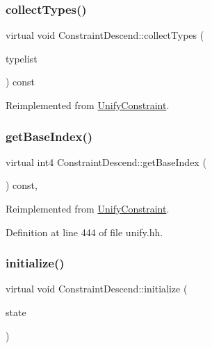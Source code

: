 \subsubsection{\texorpdfstring{collectTypes()}{collectTypes()}}
{\footnotesize\ttfamily virtual void Constraint\+Descend\+::collect\+Types (\begin{DoxyParamCaption}\item[{vector$<$ \mbox{\hyperlink{class_unify_datatype}{Unify\+Datatype}} $>$ \&}]{typelist }\end{DoxyParamCaption}) const\hspace{0.3cm}{\ttfamily [virtual]}}



Reimplemented from \mbox{\hyperlink{class_unify_constraint_acb83b6bea3b21e13054e72ac9cfaba0f}{Unify\+Constraint}}.

\mbox{\label{class_constraint_descend_ac1d8e7071688fed4a52ef6aace039344}} 
\subsubsection{\texorpdfstring{getBaseIndex()}{getBaseIndex()}}
{\footnotesize\ttfamily virtual int4 Constraint\+Descend\+::get\+Base\+Index (\begin{DoxyParamCaption}\item[{void}]{ }\end{DoxyParamCaption}) const\hspace{0.3cm}{\ttfamily [inline]}, {\ttfamily [virtual]}}



Reimplemented from \mbox{\hyperlink{class_unify_constraint_a44f0164f38ac1fdc44fc73ebe7678de1}{Unify\+Constraint}}.



Definition at line 444 of file unify.\+hh.

\mbox{\label{class_constraint_descend_aaf9c2b3a92648d9d13295791ade0afad}} 
\subsubsection{\texorpdfstring{initialize()}{initialize()}}
{\footnotesize\ttfamily virtual void Constraint\+Descend\+::initialize (\begin{DoxyParamCaption}\item[{\mbox{\hyperlink{class_unify_state}{Unify\+State}} \&}]{state }\end{DoxyParamCaption})\hspace{0.3cm}{\ttfamily [virtual]}}



